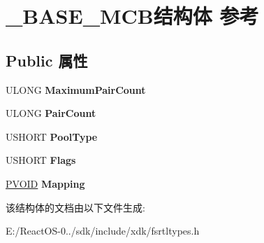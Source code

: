 \hypertarget{struct___b_a_s_e___m_c_b}{}\section{\+\_\+\+B\+A\+S\+E\+\_\+\+M\+C\+B结构体 参考}
\label{struct___b_a_s_e___m_c_b}
\subsection*{Public 属性}
\begin{DoxyCompactItemize}
\item 
\mbox{\label{struct___b_a_s_e___m_c_b_a231a11a39fdf6235b110f8142262f349}} 
U\+L\+O\+NG {\bfseries Maximum\+Pair\+Count}
\item 
\mbox{\label{struct___b_a_s_e___m_c_b_a00fe110cbd90985e2c8b599030f20af4}} 
U\+L\+O\+NG {\bfseries Pair\+Count}
\item 
\mbox{\label{struct___b_a_s_e___m_c_b_a354c6ec1c30eeaf04a1686dfa09ac6cd}} 
U\+S\+H\+O\+RT {\bfseries Pool\+Type}
\item 
\mbox{\label{struct___b_a_s_e___m_c_b_a6792c7b41deb7acec9d916b4d0dcdf9a}} 
U\+S\+H\+O\+RT {\bfseries Flags}
\item 
\mbox{\label{struct___b_a_s_e___m_c_b_add9ffc8175ed120e7b71c8137eff1147}} 
\hyperlink{interfacevoid}{P\+V\+O\+ID} {\bfseries Mapping}
\end{DoxyCompactItemize}


该结构体的文档由以下文件生成\+:\begin{DoxyCompactItemize}
\item 
E\+:/\+React\+O\+S-\/0../sdk/include/xdk/fsrtltypes.\+h\end{DoxyCompactItemize}
